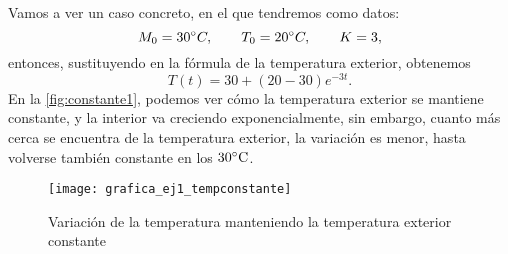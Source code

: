 \begin{ejemplo}
	Vamos a ver un caso concreto, en el que tendremos como datos:
	\begin{equation}
		M_0 = 30\degree C, \qquad T_0 = 20\degree C, \qquad K = 3,
	\end{equation}
	entonces, sustituyendo en la fórmula de la temperatura exterior, obtenemos
	\begin{equation}
		T(t) = 30+(20-30)e^{-3t}.
	\end{equation}
	En la \autoref{fig:constante1}, podemos ver cómo la temperatura exterior se mantiene constante, y la interior va creciendo exponencialmente, sin embargo, cuanto más cerca se encuentra de la temperatura exterior, la variación es menor, hasta volverse también constante en los $30 \celsius$.
	\begin{figure}[h!]
		\centering
		\texttt{[image: grafica\_ej1\_tempconstante]}
		\caption{Variación de la temperatura manteniendo la temperatura exterior constante}
		\label{fig:constante1}
	\end{figure}
\end{ejemplo}

